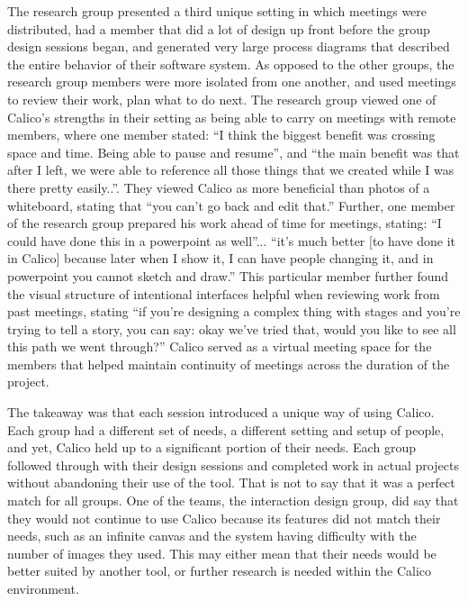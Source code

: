 \documentclass[12pt,fleqn]{ucithesis}
\begin{document}
The research group presented a third unique setting in which meetings were distributed, had a member that did a lot of design up front before the group design sessions began, and generated very large process diagrams that described the entire behavior of their software system. As opposed to the other groups, the research group members were more isolated from one another, and used meetings to review their work, plan what to do next. The research group viewed one of Calico's strengths in their setting as being able to carry on meetings with remote members, where one member stated: ``I think the biggest benefit was crossing space and time. Being able to pause and resume'', and ``the main benefit was that after I left, we were able to reference all those things that we created while I was there pretty easily..''. They viewed Calico as more beneficial than photos of a whiteboard, stating that ``you can't go back and edit that.'' Further, one member of the research group prepared his work ahead of time for meetings, stating: ``I could have done this in a powerpoint as well''... ``it's much better [to have done it in Calico] because later when I show it, I can have people changing it, and in powerpoint you cannot sketch and draw.'' This particular member further found the visual structure of intentional interfaces helpful when reviewing work from past meetings, stating ``if you're designing a complex thing with stages and you're trying to tell a story, you can say: okay we've tried that, would you like to see all this path we went through?'' Calico served as a virtual meeting space for the members that helped maintain continuity of meetings across the duration of the project.

%

The takeaway was that each session introduced a unique way of using Calico. Each group had a different set of needs, a different setting and setup of people, and yet, Calico held up to a significant portion of their needs. Each group followed through with their design sessions and completed work in actual projects without abandoning their use of the tool. That is not to say that it was a perfect match for all groups. One of the teams, the interaction design group, did say that they would not continue to use Calico because its features did not match their needs, such as an infinite canvas and the system having difficulty with the number of images they used. This may either mean that their needs would be better suited by another tool, or further research is needed within the Calico environment.
\end{document}
